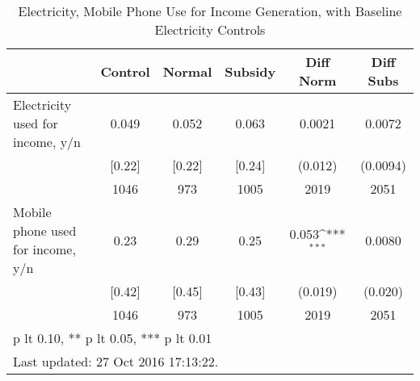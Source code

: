 \begin{table}[htbp]\centering
\def\sym#1{\ifmmode^{#1}\else\(^{#1}\)\fi}
\caption{Electricity, Mobile Phone Use for Income Generation, with Baseline Electricity Controls \label{tab:"balance"}}
\begin{tabular*}{0.9\hsize}{@{\hskip\tabcolsep\extracolsep\fill}l*{1}{ccccc}}
\toprule
                                &  Control&   Normal&  Subsidy&Diff Norm         &Diff Subs         \\
\midrule
Electricity used for income, y/n&    0.049&    0.052&    0.063&   0.0021         &   0.0072         \\
                                &   [0.22]&   [0.22]&   [0.24]&  (0.012)         & (0.0094)         \\
                                &     1046&      973&     1005&     2019         &     2051         \\
Mobile phone used for income, y/n&     0.23&     0.29&     0.25&    0.053\sym{***}&   0.0080         \\
                                &   [0.42]&   [0.45]&   [0.43]&  (0.019)         &  (0.020)         \\
                                &     1046&      973&     1005&     2019         &     2051         \\
\bottomrule
\multicolumn{6}{l}{\footnotesize * p lt 0.10, ** p lt 0.05, *** p lt 0.01}\\
\multicolumn{6}{l}{\footnotesize Last updated: 27 Oct 2016 17:13:22.}\\
\end{tabular*}
\end{table}
